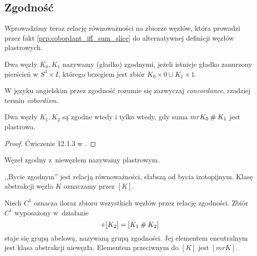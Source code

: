 
\subsection{Zgodność}
Wprowadzimy teraz relację równoważności na zbiorze węzłów, która prowadzi przez fakt \ref{prp:cobordant_iff_sum_slice} do alternatywnej definicji węzłów plastrowych.

\begin{definition}[zgodność]
    Dwa węzły $K_0, K_1$ nazywamy (gładko) zgodnymi, jeżeli istnieje gładko zanurzony pierścień w $S^3 \times I$, którego brzegiem jest zbiór $K_0 \times 0 \cup K_1 \times 1$.
\end{definition}

W języku angielskim przez zgodność rozumie się zazwyczaj \emph{concordance}, rzadziej termin \emph{cobordism}.

\begin{proposition}
    \label{prp:cobordant_iff_sum_slice}
    Dwa węzły $K_1, K_2$ są zgodne wtedy i tylko wtedy, gdy suma $mr K_0 \mathbin{\#} K_1$ jest plastrowa.
\end{proposition}

\begin{proof}
    Ćwiczenie 12.1.3 w \cite{kawauchi96}.
\end{proof}

\begin{definition}
    Węzeł zgodny z~niewęzłem nazywamy plastrowym.
\end{definition}

,,Bycie zgodnym'' jest relacją równoważności, słabszą od bycia izotopijnym.
Klasę abstrakcji węzła $K$ oznaczamy przez $[K]$.

\begin{definition}
    Niech $C^1$ oznacza iloraz zbioru wszystkich węzłów przez relację zgodności.
    Zbiór $C^1$ wyposażony w~działanie
    \begin{equation}
        [K_1] + [K_2] = [K_1 \shrap K_2]
    \end{equation}
    staje się grupą abelową, nazywaną grupą zgodności.
    Jej elementem eneutralnym jest klasa abstrakcji niewęzła.
    Elementem przeciwnym do $[K]$ jest $[mr K]$.
\end{definition}

